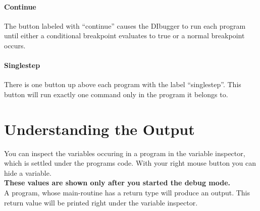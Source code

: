 \documentclass[parskip=full]{memoir}
\begin{document}
\paragraph{Continue}
The button labeled with \enquote{continue} causes the DIbugger to run each program until either a conditional breakpoint evaluates to true or a normal breakpoint occurs.
\paragraph{Singlestep}
There is one button up above each program with the label \enquote{singlestep}. This button will run exactly one command only in the program it belongs to.
\section{Understanding the Output}
You can inspect the variables occuring in a program in the variable inspector, which is settled under the programs code. With your right mouse button you can hide a variable.\\
\textbf{These values are shown only after you started the debug mode.} \\
A program, whose main-routine has a return type will produce an output. 
This return value will be printed right under the variable inspector.
\end{document}
